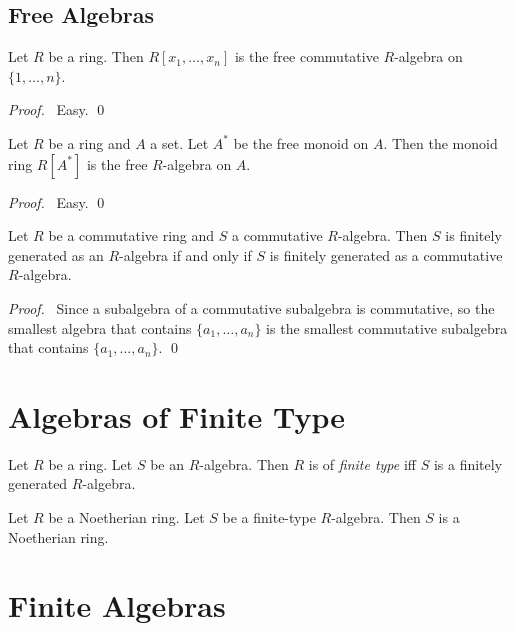 \section{Free Algebras}

\begin{prop}
Let $R$ be a ring. Then $R[x_1, \ldots, x_n]$ is the free commutative $R$-algebra on $\{ 1, \ldots, n \}$.
\end{prop}

\begin{proof}
\pf\ Easy. \qed
\end{proof}

\begin{prop}
Let $R$ be a ring and $A$ a set. Let $A^*$ be the free monoid on $A$. Then the monoid ring $R[A^*]$ is the free $R$-algebra on $A$.
\end{prop}

\begin{proof}
\pf\ Easy. \qed
\end{proof}

\begin{prop}
Let $R$ be a commutative ring and $S$ a commutative $R$-algebra. Then $S$ is finitely generated as an $R$-algebra if and only if $S$ is finitely generated as a commutative $R$-algebra.
\end{prop}

\begin{proof}
\pf\ Since a subalgebra of a commutative subalgebra is commutative, so the smallest algebra that contains $\{a_1, \ldots, a_n\}$ is the smallest commutative subalgebra that contains $\{a_1, \ldots, a_n\}$. \qed
\end{proof}

\chapter{Algebras of Finite Type}

\begin{df}
Let $R$ be a ring. Let $S$ be an $R$-algebra. Then $R$ is of \emph{finite type} iff $S$ is a finitely generated $R$-algebra.
\end{df}

\begin{prop}
Let $R$ be a Noetherian ring. Let $S$ be a finite-type $R$-algebra. Then $S$ is a Noetherian ring.
\end{prop}


\chapter{Finite Algebras}


